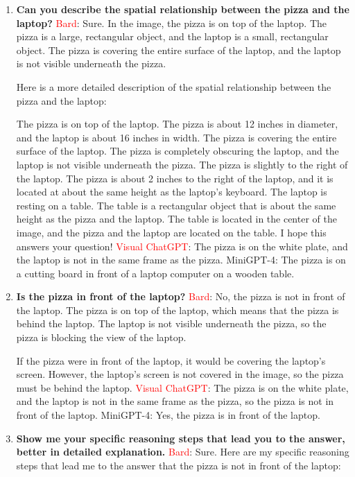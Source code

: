     \begin{enumerate}
        \item \textbf{Can you describe the spatial relationship between the pizza and the laptop?}
        \subitem \textcolor{Red}{Bard}: 
        Sure. In the image, the pizza is on top of the laptop. The pizza is a large, rectangular object, and the laptop is a small, rectangular object. The pizza is covering the entire surface of the laptop, and the laptop is not visible underneath the pizza.

        Here is a more detailed description of the spatial relationship between the pizza and the laptop:

        The pizza is on top of the laptop. The pizza is about 12 inches in diameter, and the laptop is about 16 inches in width.
        The pizza is covering the entire surface of the laptop. The pizza is completely obscuring the laptop, and the laptop is not visible underneath the pizza.
        The pizza is slightly to the right of the laptop. The pizza is about 2 inches to the right of the laptop, and it is located at about the same height as the laptop's keyboard.
        The laptop is resting on a table. The table is a rectangular object that is about the same height as the pizza and the laptop. The table is located in the center of the image, and the pizza and the laptop are located on the table.
        I hope this answers your question!
        \subitem \textcolor{red}{Visual ChatGPT}: The pizza is on the white plate, and the laptop is not in the same frame as the pizza.
        \subitem MiniGPT-4: The pizza is on a cutting board in front of a laptop computer on a wooden table.
        \item \textbf{Is the pizza in front of the laptop?}
        \subitem \textcolor{Red}{Bard}: No, the pizza is not in front of the laptop. The pizza is on top of the laptop, which means that the pizza is behind the laptop. The laptop is not visible underneath the pizza, so the pizza is blocking the view of the laptop.

        If the pizza were in front of the laptop, it would be covering the laptop's screen. However, the laptop's screen is not covered in the image, so the pizza must be behind the laptop.
        \subitem \textcolor{red}{Visual ChatGPT}: The pizza is on the white plate, and the laptop is not in the same frame as the pizza, so the pizza is not in front of the laptop.
        \subitem MiniGPT-4: Yes, the pizza is in front of the laptop.
        \item \textbf{Show me your specific reasoning steps that lead you to the answer, better in detailed explanation.}
        \subitem \textcolor{Red}{Bard}: 
        Sure. Here are my specific reasoning steps that lead me to the answer that the pizza is not in front of the laptop:


\end{enumerate}
